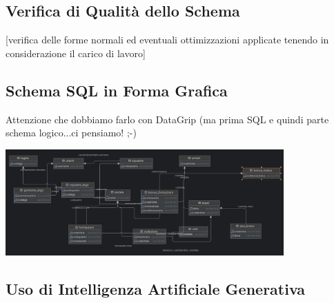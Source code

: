 \documentclass[a4paper,12pt]{article}
\begin{document}
\subsection{Verifica di Qualità dello Schema}
[verifica delle forme normali ed eventuali ottimizzazioni applicate tenendo in considerazione il carico di lavoro]

\subsection{Schema SQL in Forma Grafica}
Attenzione che dobbiamo farlo con DataGrip (ma prima SQL e quindi parte schema logico...ci pensiamo! ;-)
\begin{center}
	\includegraphics[width=0.8\textwidth]{project_bd.png}
\end{center}



\subsection{Uso di Intelligenza Artificiale Generativa}
\end{document}

